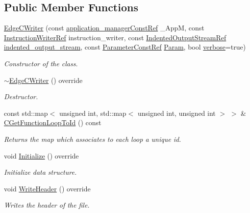 \subsection*{Public Member Functions}
\begin{DoxyCompactItemize}
\item 
\hyperlink{classEdgeCWriter_a52eff5f5bbf3728891529a8164b5aaae}{Edge\+C\+Writer} (const \hyperlink{application__manager_8hpp_abb985163a2a3fb747f6f03b1eaadbb44}{application\+\_\+manager\+Const\+Ref} \+\_\+\+AppM, const \hyperlink{instruction__writer_8hpp_a40ea26c38a2909ba48f88f997144b260}{Instruction\+Writer\+Ref} instruction\+\_\+writer, const \hyperlink{indented__output__stream_8hpp_ab32278e11151ef292759c88e99b77feb}{Indented\+Output\+Stream\+Ref} \hyperlink{classCWriter_ac6d016436e065c31dd5152a7cc30e507}{indented\+\_\+output\+\_\+stream}, const \hyperlink{Parameter_8hpp_a37841774a6fcb479b597fdf8955eb4ea}{Parameter\+Const\+Ref} \hyperlink{classCWriter_a3555d61ac3540440862ed211800b80be}{Param}, bool \hyperlink{classCWriter_a8d5b6fe4a045d7e9ca997a566274cdb5}{verbose}=true)
\begin{DoxyCompactList}\small\item\em Constructor of the class. \end{DoxyCompactList}\item 
\hyperlink{classEdgeCWriter_af374509bd9ecd11aa640c9fd71593113}{$\sim$\+Edge\+C\+Writer} () override
\begin{DoxyCompactList}\small\item\em Destructor. \end{DoxyCompactList}\item 
const std\+::map$<$ unsigned int, std\+::map$<$ unsigned int, unsigned int $>$ $>$ \& \hyperlink{classEdgeCWriter_afcf0813b40974ad65e3e4ba991ab070f}{C\+Get\+Function\+Loop\+To\+Id} () const
\begin{DoxyCompactList}\small\item\em Returns the map which associates to each loop a unique id. \end{DoxyCompactList}\item 
void \hyperlink{classEdgeCWriter_a514808888307cd604ce3b453b550c6a3}{Initialize} () override
\begin{DoxyCompactList}\small\item\em Initialize data structure. \end{DoxyCompactList}\item 
void \hyperlink{classEdgeCWriter_a8b053256b8c65aca7d7539ebd23537c8}{Write\+Header} () override
\begin{DoxyCompactList}\small\item\em Writes the header of the file. \end{DoxyCompactList}\end{DoxyCompactItemize}
